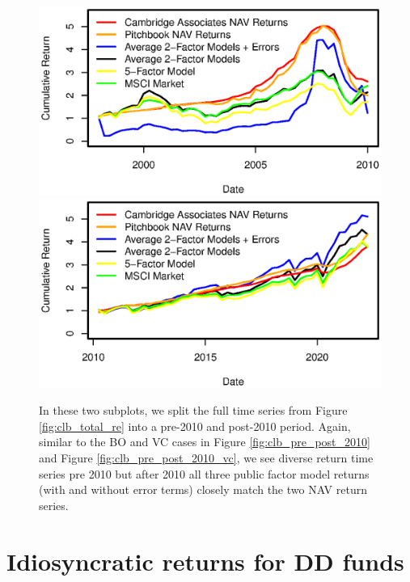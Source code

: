 \begin{figure}[H]
	\centering
	\includegraphics{Figures/XTotalErrorSeriesREpre2010}
	\includegraphics{Figures/XTotalErrorSeriesREpost2010}
	\caption{
		In these two subplots, we split the full time series from Figure \ref{fig:clb_total_re} into a pre-2010 and post-2010 period.
		Again, similar to the BO and VC cases in Figure \ref{fig:clb_pre_post_2010} and  Figure \ref{fig:clb_pre_post_2010_vc}, we see diverse return time series pre 2010 but after 2010 all three public factor model returns (with and without error terms) closely match the two NAV return series.
	}
	\label{fig:clb_pre_post_2010_RE}
\end{figure}


\section{Idiosyncratic returns for DD funds}
\label{sec:dd_errors}


